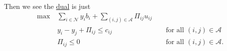 \begin{explanation}
	Then we see the \hyperref[def:dual]{dual} is just
	\[
		\begin{alignedat}{3}
			\max~ & \sum\limits_{i\in\mathcal{N}}y_{i}b_{i}+\sum\limits_{(i, j)\in\mathcal{A}} \Pi_{ij}u_{ij}                                            \\
			      & y_{i} - y_{j}+\Pi_{ij}\leq c_{ij}                                                         &  & \text{ for all }(i, j)\in\mathcal{A}  \\
			      & \Pi_{ij}\leq 0                                                                            &  & \text{ for all }(i, j)\in\mathcal{A}.
		\end{alignedat}
	\]
\end{explanation}